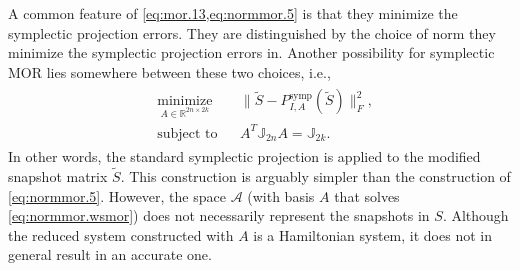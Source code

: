 \begin{rem}
A common feature of \cref{eq:mor.13,eq:normmor.5} is that they minimize the symplectic projection errors. They are distinguished by the choice of norm they minimize the symplectic projection errors in. Another possibility for symplectic MOR lies somewhere between these two choices, i.e.,
\begin{eqnarray} \label{eq:normmor.wsmor}
\begin{aligned}
& \underset{ A\in \mathbb{R}^{2n\times 2k}}{\text{minimize}}
& & \| \tilde S - P^\text{symp}_{I, A}(\tilde S) \|_F^2, \\
& \text{subject to}
& & A^T \mathbb J_{2n} A = \mathbb J_{2k}.
\end{aligned}
\end{eqnarray}
In other words, the standard symplectic projection is applied to the modified snapshot matrix $\tilde S$. This construction is arguably simpler than the construction of \cref{eq:normmor.5}. However, the space $\mathcal A$ (with basis $A$ that solves \eqref{eq:normmor.wsmor}) does not necessarily represent the snapshots in $S$. Although the reduced system constructed with $A$ is a Hamiltonian system, it does not in general result in an accurate one. 
\end{rem}

